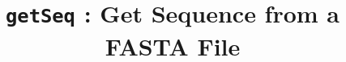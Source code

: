 

\pagestyle{noweb}

\title{\texttt{getSeq} : Get Sequence from a
  FASTA File}
\author{}

\date{}
\maketitle





